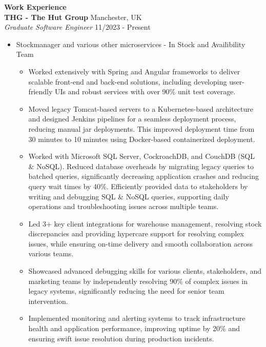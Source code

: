 \documentclass{article}
\begin{document}
\noindent \large \textbf{\textcolor{NavyBlue}{Work Experience}} \vspace{3pt} \\
\noindent \normalsize \textbf{THG - The Hut Group} \hfill Manchester, UK \\
\textit{Graduate Software Engineer} \hfill 11/2023 - Present
\begin{itemize}[noitemsep,nolistsep,leftmargin=*]
    \item {\normalsize {Stockmanager and various other microservices - In Stock and Availibility Team }
        \begin{itemize}
            \item Worked extensively with Spring and Angular frameworks to deliver scalable front-end and back-end solutions, including developing user-friendly UIs and robust services with over 90\% unit test coverage.
            \item Moved legacy Tomcat-based servers to a Kubernetes-based architecture and designed Jenkins pipelines for a seamless deployment process, reducing manual jar deployments. This improved deployment time from 30 minutes to 10 minutes using Docker-based containerized deployment.
            \item Worked with Microsoft SQL Server, CockroachDB, and CouchDB (SQL \& NoSQL). Reduced database overheads by migrating legacy queries to batched queries, significantly decreasing application crashes and reducing query wait times by 40\%. Efficiently provided data to stakeholders by writing and debugging SQL \& NoSQL queries, supporting daily operations and troubleshooting issues across multiple teams.
            \item Led 3+ key client integrations for warehouse management, resolving stock discrepancies and providing hypercare support for resolving complex issues, while ensuring on-time delivery and smooth collaboration across various teams.
            \item Showcased advanced debugging skills for various clients, stakeholders, and marketing teams by independently resolving 90\% of complex issues in legacy systems, significantly reducing the need for senior team intervention.
            \item Implemented monitoring and alerting systems to track infrastructure health and application performance, improving uptime by 20\% and ensuring swift issue resolution during production incidents.
        \end{itemize}
    }
\end{itemize}
\end{document}
